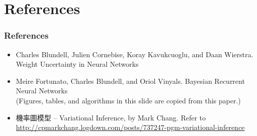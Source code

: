 \section{References}

\begin{frame}
  \frametitle{References}
  \begin{itemize}
  \item  Charles Blundell, Julien Cornebise, Koray Kavukcuoglu, and Daan Wierstra.  Weight Uncertainty in Neural Networks
  \item  Meire Fortunato, Charles Blundell, and Oriol Vinyals. Bayesian Recurrent Neural Networks \\
    (Figures, tables, and algorithms in this slide are copied from this paper.)
  \item  {\zhfont 機率圖模型} -- Variational Inference, by Mark Chang. Refer to \url{http://cpmarkchang.logdown.com/posts/737247-pgm-variational-inference}
    
  \end{itemize}
\end{frame}